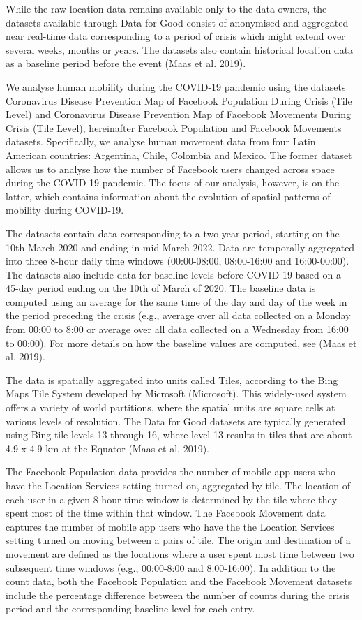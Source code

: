\documentclass[
  10pt,
  letterpaper,
  DIV=11,
  numbers=noendperiod]{scrartcl}
\begin{document}
While the raw location data remains available only to the data owners,
the datasets available through Data for Good consist of anonymised and
aggregated near real-time data corresponding to a period of crisis which
might extend over several weeks, months or years. The datasets also
contain historical location data as a baseline period before the event
(Maas et al. 2019).

We analyse human mobility during the COVID-19 pandemic using the
datasets Coronavirus Disease Prevention Map of Facebook Population
During Crisis (Tile Level) and Coronavirus Disease Prevention Map of
Facebook Movements During Crisis (Tile Level), hereinafter Facebook
Population and Facebook Movements datasets. Specifically, we analyse
human movement data from four Latin American countries: Argentina,
Chile, Colombia and Mexico. The former dataset allows us to analyse how
the number of Facebook users changed across space during the COVID-19
pandemic. The focus of our analysis, however, is on the latter, which
contains information about the evolution of spatial patterns of mobility
during COVID-19.

The datasets contain data corresponding to a two-year period, starting
on the 10th March 2020 and ending in mid-March 2022. Data are temporally
aggregated into three 8-hour daily time windows (00:00-08:00,
08:00-16:00 and 16:00-00:00). The datasets also include data for
baseline levels before COVID-19 based on a 45-day period ending on the
10th of March of 2020. The baseline data is computed using an average
for the same time of the day and day of the week in the period preceding
the crisis (e.g., average over all data collected on a Monday from 00:00
to 8:00 or average over all data collected on a Wednesday from 16:00 to
00:00). For more details on how the baseline values are computed, see
(Maas et al. 2019).

The data is spatially aggregated into units called Tiles, according to
the Bing Maps Tile System developed by Microsoft (Microsoft). This
widely-used system offers a variety of world partitions, where the
spatial units are square cells at various levels of resolution. The Data
for Good datasets are typically generated using Bing tile levels 13
through 16, where level 13 results in tiles that are about 4.9 x 4.9 km
at the Equator (Maas et al. 2019).

The Facebook Population data provides the number of mobile app users who
have the Location Services setting turned on, aggregated by tile. The
location of each user in a given 8-hour time window is determined by the
tile where they spent most of the time within that window. The Facebook
Movement data captures the number of mobile app users who have the the
Location Services setting turned on moving between a pairs of tile. The
origin and destination of a movement are defined as the locations where
a user spent most time between two subsequent time windows (e.g.,
00:00-8:00 and 8:00-16:00). In addition to the count data, both the
Facebook Population and the Facebook Movement datasets include the
percentage difference between the number of counts during the crisis
period and the corresponding baseline level for each entry.
\end{document}
